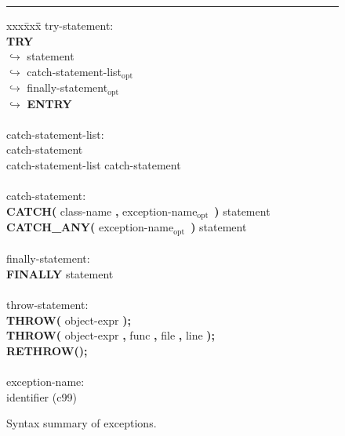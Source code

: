 \documentclass[preprint,10pt]{sigplanconf}
\newcommand{\ttb}[1]{{\normalfont\ttfamily\bfseries #1}}
\newcommand{\opt}{\ensuremath{_{\text{opt}}}\xspace}
\newcommand{\lnk}{\ensuremath{\hookrightarrow}\xspace}
\newcommand{\hr}{\rule{\columnwidth}{0.33pt}}
\begin{document}
\begin{figure}\hr
\begin{center}
{\em
\begin{tabbing}
xxx\= xxx\= \hspace*{19em}\= \kill
try-statement: \\
\> \ttb{TRY} \\ \lnk
\> \> statement \\ \lnk
\> \> catch-statement-list\opt \\ \lnk
\> \> finally-statement\opt \\ \lnk
\> \ttb{ENTRY} \\
\\
catch-statement-list: \\
\> catch-statement \\
\> catch-statement-list catch-statement \\
\\
catch-statement: \\
\> \ttb{CATCH(} class-name \ttb{,} exception-name\opt\ \ttb{)} statement \\
\> \ttb{CATCH\_ANY(} exception-name\opt\ \ttb{)} statement \\
\\
finally-statement: \\
\> \ttb{FINALLY} statement \\
\\
throw-statement: \\
\> \ttb{THROW(} object-expr \ttb{);} \\
\> \ttb{THROW(} object-expr \ttb{,} func \ttb{,} file \ttb{,} line \ttb{);} \\
\> \ttb{RETHROW();} \\
\\
exception-name: \\
\> identifier		\>\> (c99)
\end{tabbing}
}
\end{center}
\caption{Syntax summary of exceptions.\label{fig:exgram}}
\end{figure}
\end{document}
